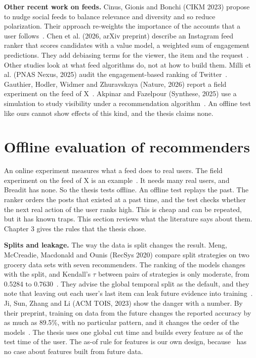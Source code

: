 \textbf{Other recent work on feeds.} Cinus, Gionis and Bonchi (CIKM 2023) propose to nudge social feeds to balance relevance and diversity and so reduce polarization. Their approach re-weights the importance of the accounts that a user follows~. Chen et al. (2026, arXiv preprint) describe an Instagram feed ranker that scores candidates with a value model, a weighted sum of engagement predictions. They add debiasing terms for the viewer, the item and the request~. Other studies look at what feed algorithms do, not at how to build them. Milli et al. (PNAS Nexus, 2025) audit the engagement-based ranking of Twitter~. Gauthier, Hodler, Widmer and Zhuravskaya (Nature, 2026) report a field experiment on the feed of X~. Akpinar and Fazelpour (Synthese, 2025) use a simulation to study visibility under a recommendation algorithm~. An offline test like ours cannot show effects of this kind, and the thesis claims none.

\section{Offline evaluation of recommenders}
\label{sec:lit-eval}

An online experiment measures what a feed does to real users. The field experiment on the feed of X is an example~. It needs many real users, and Breadit has none. So the thesis tests offline. An offline test replays the past. The ranker orders the posts that existed at a past time, and the test checks whether the next real action of the user ranks high. This is cheap and can be repeated, but it has known traps. This section reviews what the literature says about them. Chapter 3 gives the rules that the thesis chose.

\textbf{Splits and leakage.} The way the data is split changes the result. Meng, McCreadie, Macdonald and Ounis (RecSys 2020) compare split strategies on two grocery data sets with seven recommenders. The ranking of the models changes with the split, and Kendall's $\tau$ between pairs of strategies is only moderate, from 0.5284 to 0.7630~. They advise the global temporal split as the default, and they note that leaving out each user's last item can leak future evidence into training~. Ji, Sun, Zhang and Li (ACM TOIS, 2023) show the danger with a number. By their preprint, training on data from the future changes the reported accuracy by as much as 89.5\%, with no particular pattern, and it changes the order of the models~. The thesis uses one global cut time and builds every feature as of the test time of the user. The as-of rule for features is our own design, because~ has no case about features built from future data.

